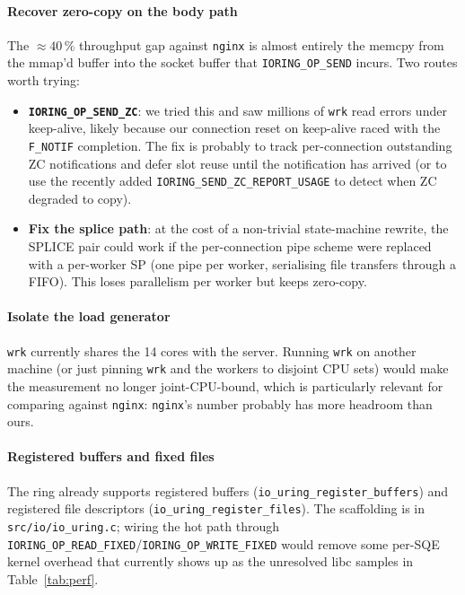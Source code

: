 \documentclass{article}
\begin{document}
\paragraph{Recover zero-copy on the body path}
The $\approx 40\,\%$ throughput gap against \texttt{nginx} is almost entirely the memcpy
from the mmap'd buffer into the socket buffer that \texttt{IORING\_OP\_SEND} incurs.
Two routes worth trying:
\begin{itemize}
    \item \textbf{\texttt{IORING\_OP\_SEND\_ZC}}: we tried this and saw millions of
    \texttt{wrk} read errors under keep-alive, likely because our connection reset on
    keep-alive raced with the \texttt{F\_NOTIF} completion. The fix is probably to
    track per-connection outstanding ZC notifications and defer slot reuse until the
    notification has arrived (or to use the recently added
    \texttt{IORING\_SEND\_ZC\_REPORT\_USAGE} to detect when ZC degraded to copy).
    \item \textbf{Fix the splice path}: at the cost of a non-trivial state-machine
    rewrite, the SPLICE pair could work if the per-connection pipe scheme were
    replaced with a per-worker SP (one pipe per worker, serialising file transfers
    through a FIFO). This loses parallelism per worker but keeps zero-copy.
\end{itemize}

\paragraph{Isolate the load generator}
\texttt{wrk} currently shares the 14 cores with the server. Running \texttt{wrk} on another machine (or just pinning \texttt{wrk} and the workers to disjoint CPU sets) would make the measurement no longer joint-CPU-bound, which is particularly relevant for comparing against \texttt{nginx}: \texttt{nginx}'s number probably has more headroom than ours.

\paragraph{Registered buffers and fixed files}
The ring already supports registered buffers (\texttt{io\_uring\_register\_buffers}) and registered file descriptors (\texttt{io\_uring\_register\_files}). The scaffolding is in \texttt{src/io/io\_uring.c}; wiring the hot path through \texttt{IORING\_OP\_READ\_FIXED}/\texttt{IORING\_OP\_WRITE\_FIXED} would remove some per-SQE kernel overhead that currently shows up as the unresolved libc samples in Table~\ref{tab:perf}.
\end{document}
